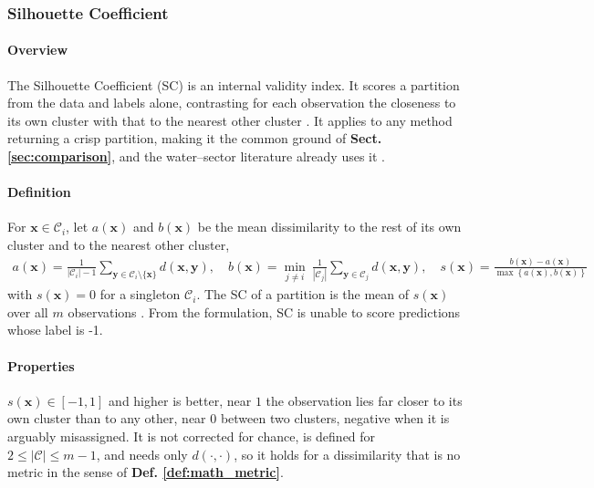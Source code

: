 \subsubsection{Silhouette Coefficient}
\label{sec:measure:silhouette}

\paragraph{Overview}
\label{sec:measure:silhouette:overview}
The Silhouette Coefficient (SC) is an internal validity index. It scores a partition from the data and labels alone, contrasting for each observation the closeness to its own cluster with that to the nearest other cluster \cite{ref_10, ref_11}.
It applies to any method returning a crisp partition, making it the common ground of \textbf{Sect. \ref{sec:comparison}}, and the water–sector literature already uses it \cite{ref_17}.

\paragraph{Definition}
\label{sec:measure:silhouette:definition}
For $\mathbf x \in \mathcal C_i$, let $a(\mathbf x)$ and $b(\mathbf x)$ be the mean dissimilarity to the rest of its own cluster and to the nearest other cluster,
\begin{align}
    a(\mathbf x) = \tfrac{1}{|\mathcal C_i| - 1} \textstyle\sum_{\mathbf y \in \mathcal C_i \setminus \{ \mathbf x \}} d(\mathbf x, \mathbf y),
    \quad
    b(\mathbf x) = \min_{j \neq i} ~ \tfrac{1}{|\mathcal C_j|} \textstyle\sum_{\mathbf y \in \mathcal C_j} d(\mathbf x, \mathbf y),
    \quad
    s(\mathbf x) = \tfrac{b(\mathbf x) - a(\mathbf x)}{\max \left\{ a(\mathbf x), b(\mathbf x) \right\}}
\end{align}
with $s(\mathbf x) = 0$ for a singleton $\mathcal C_i$. The SC of a partition is the mean of $s(\mathbf x)$ over all $m$ observations \cite{ref_10, ref_11, ref_24}.
From the formulation, SC is unable to score predictions whose label is -1.

\paragraph{Properties}
\label{sec:measure:silhouette:properties}
$s(\mathbf x) \in [-1, 1]$ and higher is better, near $1$ the observation lies far closer to its own cluster than to any other, near $0$ between two clusters, negative when it is arguably misassigned. It is not corrected for chance, is defined for $2 \le |\mathcal C| \le m - 1$, and needs only $d(\cdot, \cdot)$, so it holds for a dissimilarity that is no metric in the sense of \textbf{Def. \ref{def:math_metric}}.

